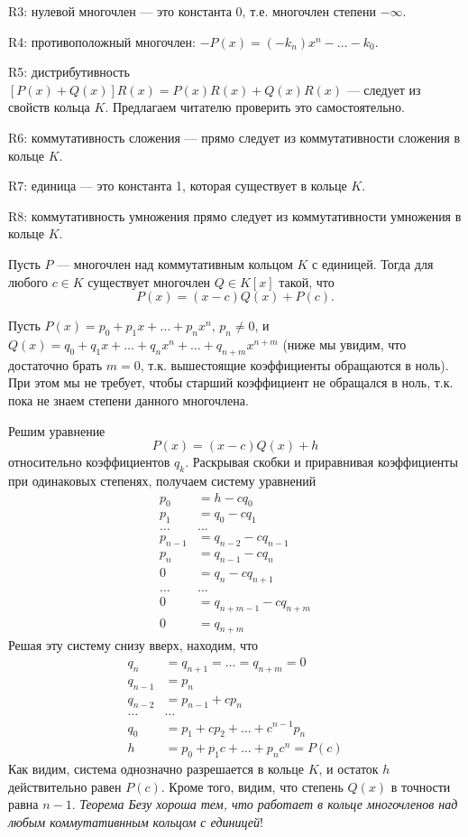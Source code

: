 \begin{enumerate}
R3: нулевой многочлен --- это константа 0, т.е. многочлен степени $-\infty$.

R4: противоположный многочлен: $-P(x)=(-k_n)x^n-\dots-k_0$.

R5: дистрибутивность $[P(x)+Q(x)]R(x) = P(x)R(x) + Q(x)R(x)$ --- следует из свойств кольца $K$. Предлагаем читателю проверить это самостоятельно.

R6: коммутативность сложения --- прямо следует из коммутативности сложения в кольце $K$.

R7: единица --- это константа 1, которая существует в кольце $K$.

R8: коммутативность умножения прямо следует из коммутативности умножения в кольце $K$.


\begin{thrm}[Без\'y]
Пусть $P$ --- многочлен над коммутативным кольцом $K$ с единицей. Тогда для любого $c\in K$ существует многочлен $Q\in K[x]$ такой, что
$$
P(x) = (x-c)Q(x) + P(c).
$$
\end{thrm}
\pf
Пусть $P(x)=p_0+p_1x+\dots+p_nx^n$, $p_n\ne 0$, и $Q(x)=q_0+q_1x+\dots+q_nx^n+\dots+q_{n+m}x^{n+m}$ (ниже мы увидим, что достаточно брать $m=0$, т.к. вышестоящие коэффициенты обращаются в ноль). При этом мы не требует, чтобы старший коэффициент не обращался в ноль, т.к. пока не знаем степени данного многочлена.

Решим уравнение
$$
P(x) = (x-c)Q(x) + h
$$
относительно коэффициентов $q_k$. Раскрывая скобки и приравнивая коэффициенты при одинаковых степенях, получаем систему уравнений
\begin{align*}
p_0 & = h-cq_0 \\
p_1 & = q_0-cq_1 \\
\dots & \dots \\
p_{n-1} & = q_{n-2}-cq_{n-1} \\
p_n & = q_{n-1}-cq_n \\
0 & =  q_n-cq_{n+1} \\
\dots & \dots \\
0 & = q_{n+m-1}-cq_{n+m} \\
0 & = q_{n+m}
\end{align*}
Решая эту систему снизу вверх, находим, что
\begin{align*}
q_n & = q_{n+1}=\dots=q_{n+m}=0 \\
q_{n-1} & = p_n \\
q_{n-2} & = p_{n-1} + c p_n \\
\dots & \dots \\
q_0 & = p_1+cp_2+\dots +c^{n-1}p_n \\
h & =  p_0 + p_1c+\dots +p_nc^n = P(c)
\end{align*}
Как видим, система однозначно разрешается в кольце $K$, и остаток $h$ действительно равен $P(c)$. Кроме того, видим, что степень $Q(x)$ в точности равна $n-1$.
\epf
\textit{Теорема Безу хороша тем, что работает в кольце многочленов над любым коммутативнным кольцом с единицей}!


\end{enumerate}
